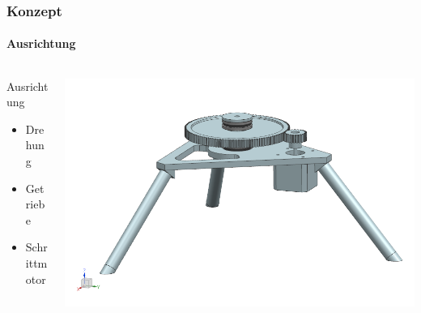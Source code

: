 \begin{frame}
    \frametitle{Konzept}
    \framesubtitle{Ausrichtung}
    \begin{columns}
        \begin{column}{0.4\textwidth}
            \begin{block}{Ausrichtung}
                \begin{itemize}
                    \item Drehung
                    \item Getriebe
                    \item Schrittmotor
                \end{itemize}
            \end{block}
        \end{column}
        \begin{column}{0.6\textwidth}
            \centering
            \includegraphics[width=1.0\textwidth, trim = 25mm 23mm 5mm 15mm, clip]{../doc/fig/Bild_Drehturm.png}
        \end{column}
    \end{columns}
\end{frame}

